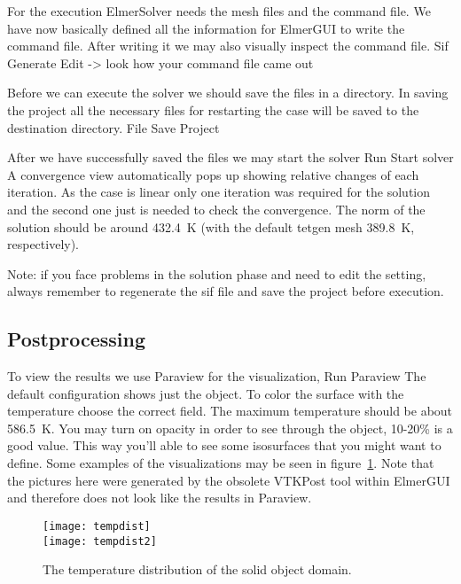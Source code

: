 For the execution 
ElmerSolver needs the mesh files and the command file. We have now basically defined
all the information for ElmerGUI to write the command file. After writing it we may also visually 
inspect the command file.
\ttbegin
Sif 
  Generate
  Edit -> look how your command file came out  
\ttend

Before we can execute the solver we should save the files in a directory. In saving the project all the
necessary files for restarting the case will be saved to the 
destination directory.
\ttbegin
File 
  Save Project
\ttend

After we have successfully saved the files we may start the solver
\ttbegin
Run
  Start solver
\ttend
A convergence view automatically pops up showing relative changes of each iteration.
As the case is linear only one iteration was required for the solution and the second one
just is needed to check the convergence. The norm of the solution
should be around 432.4~K (with the default tetgen mesh 389.8~K, respectively).

Note: if you face problems in the solution phase and need to edit the setting, always remember to regenerate the
sif file and save the project before execution.


\subsection*{Postprocessing}

To view the results we use Paraview for the visualization,
\ttbegin
Run
  Paraview
\ttend
The default configuration shows just the object. To color the surface with the temperature choose the correct field.
The maximum temperature should be about 586.5~K.
You may turn on opacity in order to see through the object, 10-20\% is a good value.
This way you'll able to see some isosurfaces that you might want to define.
Some examples of the visualizations may be seen in figure~\ref{fg:vtkpost1}. Note that the pictures here
were generated by the obsolete VTKPost tool within ElmerGUI and therefore does not look like the
results in Paraview.

\begin{figure}
\begin{center}
\texttt{[image: tempdist]} \\
\texttt{[image: tempdist2]}
\caption{The temperature distribution of the solid object domain.}\label{fg:vtkpost1}
\end{center}
\end{figure}

\hfill
\mbox{}






